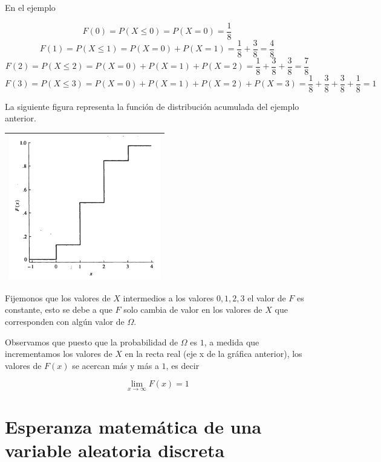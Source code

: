 \documentclass[]{book}
\theoremstyle{plain}
\theoremstyle{definition}
\theoremstyle{definition} %
\begin{document}
En el ejemplo

\[F(0) = P(X\leq 0) = P(X=0) = \frac{1}{8}\]
\[F(1) = P(X\leq 1) = P(X=0) + P(X=1) = \frac{1}{8} + \frac{3}{8}= \frac{4}{8}\]
\[F(2) = P(X\leq 2) = P(X=0) + P(X=1) + P(X=2) = \frac{1}{8} + \frac{3}{8} + \frac{3}{8} = \frac{7}{8}\]
\[F(3) = P(X\leq 3)  = P(X=0) + P(X=1) + P(X=2) + P(X=3)= \frac{1}{8} + \frac{3}{8} + \frac{3}{8} + \frac{1}{8} =1\]

La siguiente figura representa la función de distribución acumulada del
ejemplo anterior.

\begin{longtable}[]{@{}l@{}}
\toprule
\endhead
\includegraphics[width=2.60417in,height=\textheight]{img/funcion_dist_acumulada.png}\tabularnewline
\bottomrule
\end{longtable}

Fijemonos que los valores de \(X\) intermedios a los valores
\(0, 1, 2, 3\) el valor de \(F\) es constante, esto se debe a que \(F\)
solo cambia de valor en los valores de \(X\) que corresponden con algún
valor de \(\Omega\).

Observamos que puesto que la probabilidad de \(\Omega\) es \(1\), a
medida que incrementamos los valores de \(X\) en la recta real (eje x de
la gráfica anterior), los valores de \(F(x)\) se acercan más y más a
\(1\), es decir

\[\lim_{x\to\infty} F(x) = 1\]


\section{Esperanza matemática de una variable aleatoria
discreta}
\end{document}
